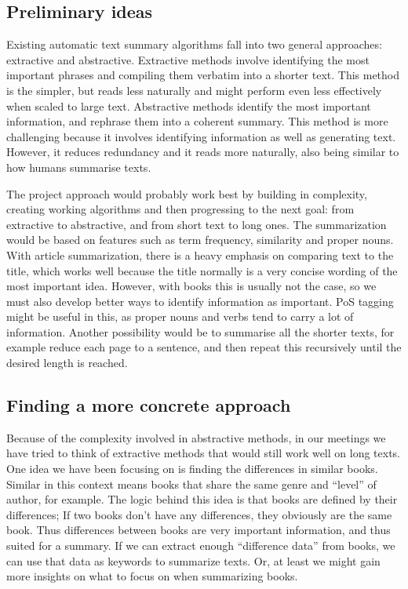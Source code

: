 \subsection{Preliminary ideas}

Existing automatic text summary algorithms fall into two general approaches:
extractive and abstractive. Extractive methods involve identifying the most
important phrases and compiling them verbatim into a shorter text. This method
is the simpler, but reads less naturally and might perform even less
effectively when scaled to large text. Abstractive methods identify the most
important information, and rephrase them into a coherent summary. This method
is more challenging because it involves identifying information as well as
generating text. However, it reduces redundancy and it reads more naturally,
also being similar to how humans summarise texts.~\cite{Gaikwad2016}

The project approach would probably work best by building in complexity,
creating working algorithms and then progressing to the next goal: from
extractive to abstractive, and from short text to long ones. The summarization
would be based on features such as term frequency, similarity and proper nouns.
With article summarization, there is a heavy emphasis on comparing text to the
title, which works well because the title normally is a very concise wording of
the most important idea. However, with books this is usually not the case, so
we must also develop better ways to identify information as important. PoS
tagging might be useful in this, as proper nouns and verbs tend to carry a lot
of information. Another possibility would be to summarise all the shorter
texts, for example reduce each page to a sentence, and then repeat this
recursively until the desired length is reached.

\subsection{Finding a more concrete approach}

Because of the complexity involved in abstractive methods, in our meetings we
have tried to think of extractive methods that would still work well on long
texts. One idea we have been focusing on is finding the differences in similar
books. Similar in this context means books that share the same genre and
``level'' of author, for example. The logic behind this idea is that books are
defined by their differences; If two books don't have any differences, they
obviously are the same book. Thus differences between books are very important
information, and thus suited for a summary. If we can extract enough
``difference data'' from books, we can use that data as keywords to summarize
texts. Or, at least we might gain more insights on what to focus on when
summarizing books.

